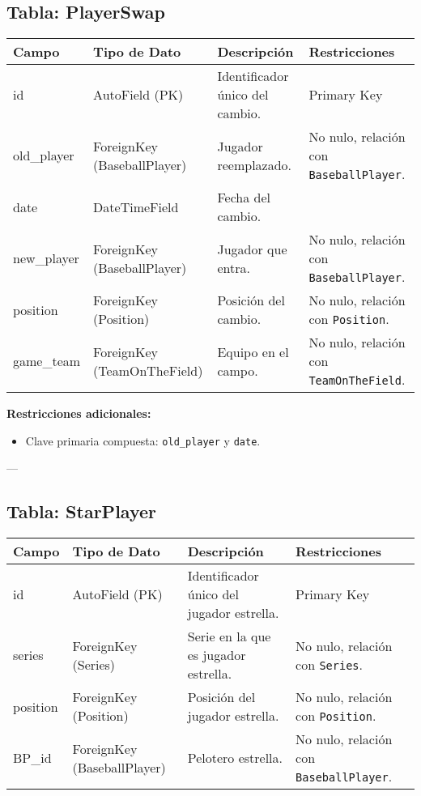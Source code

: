 \documentclass{report}
\begin{document}
    \subsection*{Tabla: PlayerSwap}
    \begin{tabular}{|>{\raggedright\arraybackslash}p{3cm}|>{\raggedright\arraybackslash}p{3cm}|>{\raggedright\arraybackslash}p{6cm}|>{\raggedright\arraybackslash}p{4cm}|}
        \hline
        \textbf{Campo} & \textbf{Tipo de Dato} & \textbf{Descripción} & \textbf{Restricciones} \\
        \hline
        id & AutoField (PK) & Identificador único del cambio. & Primary Key \\
        \hline
        old\_player & ForeignKey (BaseballPlayer) & Jugador reemplazado. & No nulo, relación con \texttt{BaseballPlayer}. \\
        \hline
        date & DateTimeField & Fecha del cambio. &  \\
        \hline
        new\_player & ForeignKey (BaseballPlayer) & Jugador que entra. & No nulo, relación con \texttt{BaseballPlayer}. \\
        \hline
        position & ForeignKey (Position) & Posición del cambio. & No nulo, relación con \texttt{Position}. \\
        \hline
        game\_team & ForeignKey (TeamOnTheField) & Equipo en el campo. & No nulo, relación con \texttt{TeamOnTheField}. \\
        \hline
    \end{tabular}
    
    \textbf{Restricciones adicionales:}
    \begin{itemize}
        \item Clave primaria compuesta: \texttt{old\_player} y \texttt{date}.
    \end{itemize}
    
    ---
    
    \subsection*{Tabla: StarPlayer}
    \begin{tabular}{|>{\raggedright\arraybackslash}p{3cm}|>{\raggedright\arraybackslash}p{3cm}|>{\raggedright\arraybackslash}p{6cm}|>{\raggedright\arraybackslash}p{4cm}|}
        \hline
        \textbf{Campo} & \textbf{Tipo de Dato} & \textbf{Descripción} & \textbf{Restricciones} \\
        \hline
        id & AutoField (PK) & Identificador único del jugador estrella. & Primary Key \\
        \hline
        series & ForeignKey (Series) & Serie en la que es jugador estrella. & No nulo, relación con \texttt{Series}. \\
        \hline
        position & ForeignKey (Position) & Posición del jugador estrella. & No nulo, relación con \texttt{Position}. \\
        \hline
        BP\_id & ForeignKey (BaseballPlayer) & Pelotero estrella. & No nulo, relación con \texttt{BaseballPlayer}. \\
        \hline
    \end{tabular}
    
\end{document}
